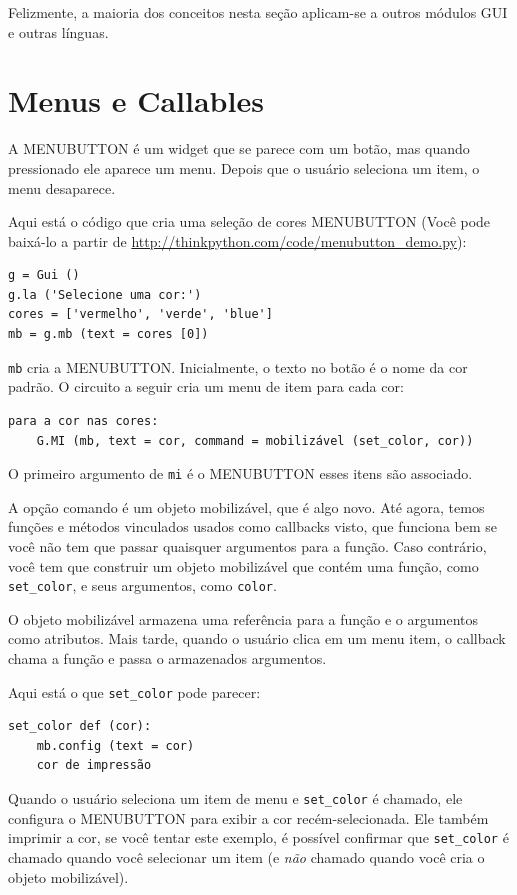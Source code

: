 \documentclass[10pt]{book}
\begin{document}
\begin{v erbatim}
Felizmente, a maioria dos conceitos nesta seção aplicam-se a
outros módulos GUI e outras línguas.


\section{Menus e Callables}

A MENUBUTTON é um widget que se parece com um botão, mas quando pressionado
ele aparece um menu. Depois que o usuário seleciona um item, o menu
desaparece.

Aqui está o código que cria uma seleção de cores MENUBUTTON
(Você pode baixá-lo a partir de \url{http://thinkpython.com/code/menubutton_demo.py}):

\begin{verbatim}
g = Gui ()
g.la ('Selecione uma cor:')
cores = ['vermelho', 'verde', 'blue']
mb = g.mb (text = cores [0])
\end{verbatim}
%
{\tt mb} cria a MENUBUTTON. Inicialmente, o texto no botão é
o nome da cor padrão. O circuito a seguir cria um menu de
item para cada cor:

\begin{verbatim}
para a cor nas cores:
    G.MI (mb, text = cor, command = mobilizável (set_color, cor))
\end{verbatim}
%
O primeiro argumento de {\tt mi} é o MENUBUTTON esses itens são
associado.

A opção {comando \tt} é um objeto mobilizável, que é algo novo.
Até agora, temos funções e métodos vinculados usados ​​como callbacks visto,
que funciona bem se você não tem que passar quaisquer argumentos para
a função. Caso contrário, você tem que construir um objeto mobilizável
que contém uma função, como \verb "set_color", e seus argumentos,
como {\tt color}.

O objeto mobilizável armazena uma referência para a função e o
argumentos como atributos. Mais tarde, quando o usuário clica em um menu
item, o callback chama a função e passa o armazenados
argumentos.

Aqui está o que \verb "set_color" pode parecer:

\begin{verbatim}
set_color def (cor):
    mb.config (text = cor)
    cor de impressão
\end{verbatim}
%
Quando o usuário seleciona um item de menu e \verb "set_color" é chamado,
ele configura o MENUBUTTON para exibir a cor recém-selecionada.
Ele também imprimir a cor, se você tentar este exemplo, é possível confirmar que
\Verb "set_color" é chamado quando você selecionar um item (e {\em não}
chamado quando você cria o objeto mobilizável).



\end{v erbatim}
\end{document}
